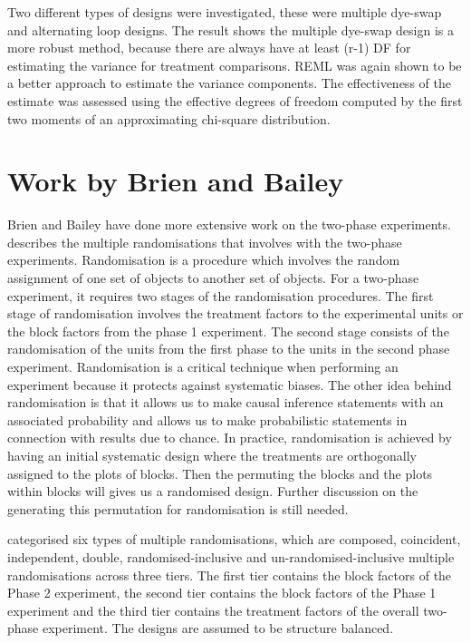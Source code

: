 \documentclass[11pt,a4paper]{article}
\begin{document}
Two different types of designs were investigated, these were multiple dye-swap and alternating loop designs. The result shows the multiple dye-swap design is a more robust method, because there are always have at least (r-1) DF for estimating the variance for treatment comparisons. REML was again shown to be a better approach to estimate the variance components. The effectiveness of the estimate was assessed using the effective degrees of freedom computed by the first two moments of an approximating chi-square distribution.

\section{Work by Brien and Bailey} 
Brien and Bailey have done more extensive work on the two-phase experiments. \cite{Brien2006b} describes the multiple randomisations that involves with the two-phase experiments. Randomisation is a procedure which involves the random assignment of one set of objects to another set of objects. For a two-phase experiment, it requires two stages of the randomisation procedures. The first stage of randomisation involves the treatment factors to the experimental units or the block factors from the phase 1 experiment. The second stage consists of the randomisation of the units from the first phase to the units in the second phase experiment. Randomisation is a critical technique when performing an experiment because it protects against systematic biases. The other idea behind randomisation is that it allows us to make causal inference statements with an associated probability and allows us to make probabilistic statements in connection with results due to chance. In practice, randomisation is achieved by having an initial systematic design where the treatments are orthogonally assigned to the plots of blocks. Then the permuting the blocks and the plots within blocks will gives us a randomised design. Further discussion on the generating this permutation for randomisation is still needed. 

\cite{Brien2006b} categorised six types of multiple randomisations, which are composed, coincident, independent, double, randomised-inclusive and un-randomised-inclusive multiple randomisations across three tiers. The first tier contains the block factors of the Phase 2 experiment, the second tier contains the block factors of the Phase 1 experiment and the third tier contains the treatment factors of the overall two-phase experiment. The designs are assumed to be structure balanced.
\end{document}
